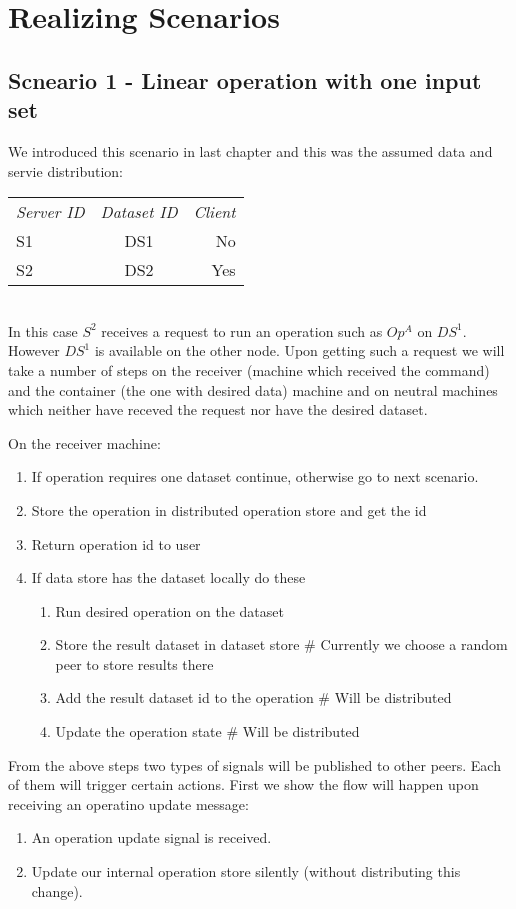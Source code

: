 \section{Realizing Scenarios}
\subsection{Scneario 1 - Linear operation with one input set}
We introduced this scenario in last chapter and this was the assumed data and servie distribution:

\begin{tabular}{ l c r }
\em{Server ID} & \em{ Dataset ID} & \em{ Client} \\
S1 & DS1 & No \\
S2 & DS2 & Yes \\
\end{tabular}\\

In this case \(S^2\) receives a request to run an operation such as \(Op^A\) on \(DS^1\).
However \(DS^1\) is available on the other node.
Upon getting such a request we will take a number of steps on the receiver (machine which received the command)
and the container (the one with desired data) machine and on neutral machines which neither have receved the
request nor have the desired dataset.

On the receiver machine:
\begin{enumerate}
\item If operation requires one dataset continue, otherwise go to next scenario.
\item Store the operation in distributed operation store and get the id
\item Return operation id to user
\item If data store has the dataset locally do these
  \begin{enumerate}
  \item Run desired operation on the dataset
  \item Store the result dataset in dataset store \# Currently we choose a random peer to store results there
  \item Add the result dataset id to the operation \# Will be distributed
  \item Update the operation state \# Will be distributed
  \end{enumerate}
\end{enumerate}

From the above steps two types of signals will be published to other peers. 
Each of them will trigger certain actions. 
First we show the flow will happen upon receiving an operatino update message:
\begin{enumerate}
\item An operation update signal is received.
\item Update our internal operation store silently (without distributing this change).
\end{enumerate}


